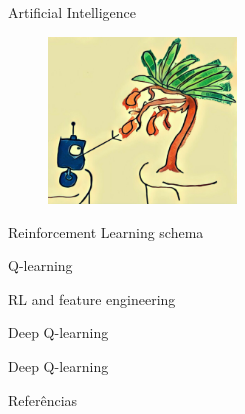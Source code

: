 \documentclass[10pt]{beamer}
\begin{document}
\nocite{Sutton98a}

\maketitle



\begin{frame}{Artificial Intelligence}

\begin{figure}[h]
\includegraphics[width=5cm]{images/robo.jpg}
\end{figure}
\end{frame}


\begin{frame}{Reinforcement Learning schema}

\end{frame}

\begin{frame}[fragile]{Q-learning}

\end{frame}

\begin{frame}[fragile]{RL and feature engineering}

\end{frame}

\begin{frame}[fragile]{Deep Q-learning}

\end{frame}

\begin{frame}[fragile]{Deep Q-learning}

\end{frame}


\begin{frame}[allowframebreaks]{Referências}

  
  

\end{frame}
\end{document}
